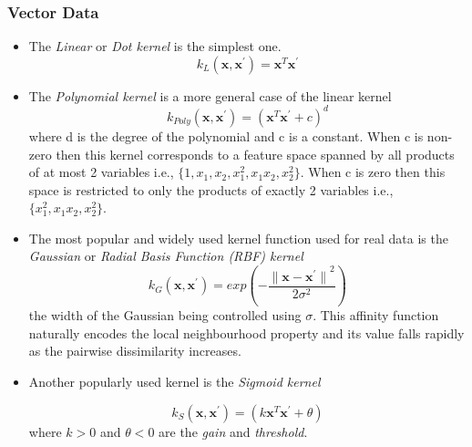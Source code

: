 \subsubsection{Vector Data}
\begin{itemize}
 \item The \textit{Linear} or \textit{Dot kernel} is the simplest one.
\begin{equation}
 k_{L}(\textbf{x},\textbf{x}^{'})=\textbf{x}^{T}\textbf{x}^{'}
\end{equation} 
 \item The \textit{Polynomial kernel} is a more general case of the linear kernel
\begin{equation}
 k_{Poly}(\textbf{x},\textbf{x}^{'})=(\textbf{x}^{T}\textbf{x}^{'}+c)^d
\end{equation} 
where d is the degree of the polynomial and c is a constant. When c is non-zero then this kernel corresponds to a feature space spanned by all products of at most 2 variables i.e., ${\lbrace 1,x_{1},x_{2},x_{1}^{2},x_{1}x_{2},x_{2}^{2} \rbrace}$. When c is zero then this space is restricted to only the products of exactly 2 variables i.e., ${\lbrace x_{1}^{2},x_{1}x_{2},x_{2}^{2} \rbrace}$.
 \item The most popular and widely used kernel function used for real data is the \textit{Gaussian} or \textit{Radial Basis Function (RBF) kernel}
\begin{equation}
 k_{G}(\textbf{x},\textbf{x}^{'})=exp \left( -\frac{{\parallel \textbf{x}-\textbf{x}^{'} \parallel}^{2}}{2\sigma^{2}}\right)
\end{equation}
the width of the Gaussian being controlled using $\sigma$. This affinity function naturally encodes the local neighbourhood property and its value falls rapidly as the pairwise dissimilarity increases.
\item Another popularly used kernel is the \textit{Sigmoid kernel}

\begin{equation}
 k_{S}(\textbf{x},\textbf{x}^{'})=(k\textbf{x}^{T}\textbf{x}^{'}+\theta) 
\end{equation}
where $k>0$ and $\theta < 0$ are the \textit{gain} and \textit{threshold}. 

\end{itemize}

